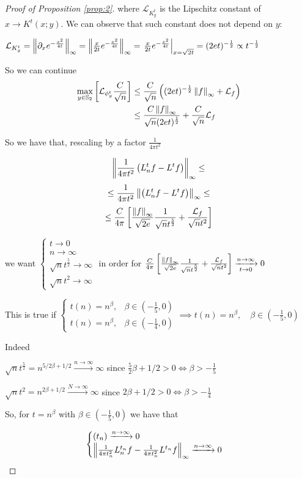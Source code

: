 \begin{proof}[Proof of Proposition \ref{prop:2}]
	where $\mathcal L_{K^t_y}$ is the Lipschitz constant of $x\rightarrow K^t(x;y)$. We can observe that such constant does not depend on $y$:
	
	$\mathcal L_{K^t_y} = \left\lVert\partial_x e^{-\frac{x^2}{4t}}\right\rVert_\infty = \left\lVert\frac{x}{2t}e^{-\frac{x^2}{4t}}\right\rVert_\infty = \left. \frac{x}{2t}e^{-\frac{x^2}{4t}}\right|_{x=\sqrt{2t}}=(2et)^{-\frac{1}{2}}\propto t ^ {-\frac{1}{2}}$
	
	So we can continue
	\begin{align*}
		\max _{y\in \mathbb S_2} \left[  \mathcal L_{\phi^t_y} \frac{C}{\sqrt{n}} \right]
		&\leq  \frac{C}{\sqrt{n}} \left( (2et)^{-\frac{1}{2}} \left\lVert f\right\rVert_\infty + \mathcal L_f \right)\\
		&\leq \frac{C\left\lVert f\right\rVert_\infty}{\sqrt{n}(2et)^\frac{1}{2}} +   \frac{C}{\sqrt{n}}\mathcal L_f\\
	\end{align*}
	
	
	So we have that, rescaling by a factor $\frac{1}{4\pi t^2}$
	
	$$\left\lVert\frac{1}{4\pi t^2}\left(L_n^tf-L^tf\right)\right\rVert_\infty\leq$$
	$$\leq \frac{1}{4\pi t^2}\left\lVert\left(L_n^tf-L^tf\right)\right\rVert_\infty \leq$$
	$$ \leq \frac{C}{4\pi}\left[\frac{\left\lVert f\right\rVert_\infty}{\sqrt{2e}}\frac{1}{\sqrt{n}t^\frac{5}{2}} + \frac{\mathcal L_f}{\sqrt{n}t^2}\right]$$
	
	we want $\begin{cases}
	t \rightarrow 0\\
	n \rightarrow \infty\\
	\sqrt{n}t^\frac{5}{2} \rightarrow \infty\\
	\sqrt{n}t^2 \rightarrow \infty
	\end{cases}$ in order for $ \frac{C}{4\pi}\left[\frac{\left\lVert f\right\rVert_\infty}{\sqrt{2e}}\frac{1}{\sqrt{n}t^\frac{5}{2}} + \frac{\mathcal L_f}{\sqrt{n}t^2}\right] \xrightarrow[t\to 0 ]{n\to\infty}0$
	
	This is true if $\begin{cases}
	t(n) = n^\beta, &\beta\in(-\frac{1}{5}, 0) \\
	t(n) = n^\beta, &\beta\in(-\frac{1}{4}, 0)
	\end{cases} \implies t(n) = n^\beta, \quad \beta\in(-\frac{1}{5}, 0)$
	
	Indeed 
	
	$\sqrt{n}t^\frac{5}{2}=n^{5/2\beta+1/2}\xrightarrow{n \to \infty} \infty$ since $\frac{5}{2}\beta+1/2>0 \iff \beta>-\frac{1}{5}$
	
	$\sqrt{n}t^2=n^{2\beta+1/2}\xrightarrow {N \to \infty} \infty$ since $2\beta+1/2>0 \iff \beta>-\frac{1}{4}$
	
	So, for $t=n^\beta$ with $\beta\in(-\frac{1}{5}, 0)$ we have that 
	
	$$\begin{cases}
	(t_n)\xrightarrow{n\to\infty}0\\
	\left\lVert\frac{1}{4\pi t_n^2}L_n^{t_n}f-\frac{1}{4\pi t_n^2}L^{t_n}f\right\rVert_\infty  \xrightarrow{n\to\infty}0
	\end{cases}$$
	
\end{proof}

